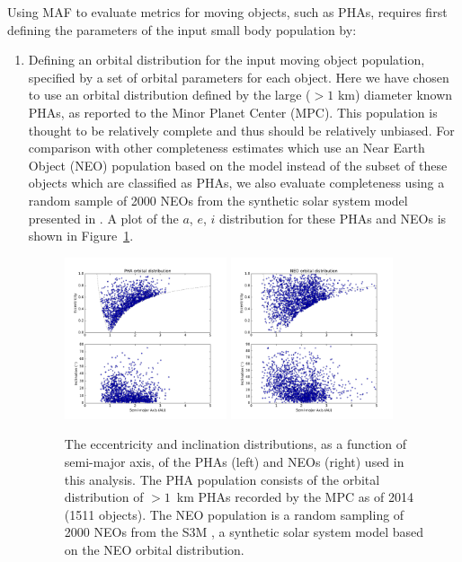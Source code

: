 Using MAF to evaluate metrics for moving objects, such as PHAs, requires first defining the parameters of the input small body population by:

\begin{enumerate}
\item{Defining an orbital distribution for the input moving object population, specified by a set of orbital parameters for each object. Here we have chosen to use an orbital distribution defined by the large ($>1$ km) diameter known PHAs, as reported to the Minor Planet Center (MPC). This population is thought to be relatively complete and thus should be relatively unbiased. For comparison with other completeness estimates which use an Near Earth Object (NEO) population based on the \cite{Bottke2002} model instead of the subset of these objects which are classified as PHAs, we also evaluate completeness using a random sample of 2000 NEOs from the synthetic solar system model presented in \cite{Grav2011}.  A plot of the $a$, $e$, $i$ distribution for these PHAs and NEOs is shown in Figure~\ref{fig:PHA_orbits}.  }
\begin{figure}
\centering
\includegraphics[width=0.45\textwidth]{figures/pha20141031_orbits} 
\includegraphics[width=0.45\textwidth]{figures/neos_2k_orbits}
\caption{The eccentricity and inclination distributions, as a function of semi-major axis, of the PHAs (left) and NEOs (right) used in this analysis. The PHA population consists of the orbital distribution of $>1$~km PHAs recorded by the MPC as of 2014 (1511 objects). The NEO population is a random sampling of 2000 NEOs from the S3M \citep{Grav2011}, a synthetic solar system model based on the \cite{Bottke2002} NEO orbital distribution. \label{fig:PHA_orbits}}
\end{figure}


\end{enumerate}
